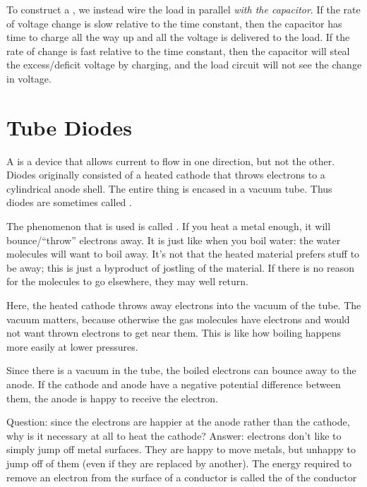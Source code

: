 \documentclass[11pt, oneside]{amsart}
\begin{document}
To construct a , we instead wire the load in
parallel \emph{with the capacitor}. If the rate of voltage change is
slow relative to the time constant, then the capacitor has time to
charge all the way up and all the voltage is delivered to the load. If
the rate of change is fast relative to the time constant, then the
capacitor will steal the excess/deficit voltage by charging, and the
load circuit will not see the change in voltage.

%

\section{Tube Diodes}

A  is a device that allows current to flow in one
direction, but not the other. Diodes originally consisted of a heated
cathode that throws electrons to a cylindrical anode shell. The entire
thing is encased in a vacuum tube. Thus diodes are sometimes called
.

The phenomenon that is used is called . If
you heat a metal enough, it will bounce/``throw'' electrons away. It is
just like when you boil water: the water molecules will want to boil
away. It's not that the heated material prefers stuff to be away; this
is just a byproduct of jostling of the material. If there is no reason
for the molecules to go elsewhere, they may well return.

Here, the heated cathode throws away electrons into the vacuum of the
tube. The vacuum matters, because otherwise the gas molecules have
electrons and would not want thrown electrons to get near them. This is
like how boiling happens more easily at lower pressures.

Since there is a vacuum in the tube, the boiled electrons can bounce
away to the anode. If the cathode and anode have a negative potential
difference between them, the anode is happy to receive the electron.

Question: since the electrons are happier at the anode rather than the
cathode, why is it necessary at all to heat the cathode? Answer:
electrons don't like to simply jump off metal surfaces. They are happy
to move  metals, but unhappy to jump off of them (even
if they are replaced by another). The energy required to remove an
electron from the surface of a conductor is called the  of the conductor
\end{document}
